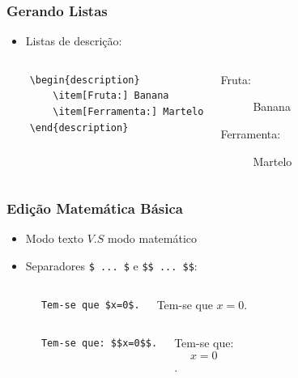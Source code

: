 \begin{frame}[fragile]
\frametitle{Gerando Listas}

\begin{itemize}
  \item Listas de descrição:
\end{itemize}
\begin{columns}
\begin{verbatim}
	\begin{description}
		\item[Fruta:] Banana
		\item[Ferramenta:] Martelo
	\end{description}
\end{verbatim}
	\begin{framed}
	\begin{description}
		\item[Fruta:] Banana
		\item[Ferramenta:] Martelo
	\end{description}
	\end{framed}
\end{columns}
\end{frame}
	
\begin{frame}[fragile]
\frametitle{Edição Matemática Básica}

\begin{itemize}
  \item Modo texto $V.S$ modo matemático
  \item Separadores \verb|$ ... $| e \verb|$$ ... $$|: 
\end{itemize}
\begin{columns}
\begin{verbatim}
	  Tem-se que $x=0$.
\end{verbatim}
	\begin{framed}
	Tem-se que $x=0$.
	\end{framed}
\end{columns}
\begin{columns}
\begin{verbatim}
	  Tem-se que: $$x=0$$.
\end{verbatim}
	\begin{framed}
	Tem-se que: $$x=0$$.
	\end{framed}
\end{columns}

\end{frame}


